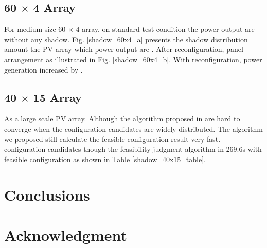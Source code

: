 \documentclass[conference]{IEEEtran}
\begin{document}
\subsection{60 $\times$ 4 Array}
For medium size 60 $\times$ 4 array, on standard test condition the power output are {\color{red}{how many KW}} without any shadow. Fig. \ref{shadow_60x4_a} presents the shadow distribution amount the PV array which power output are {\color{red}{how may KW}}. After reconfiguration, panel arrangement as illustrated in Fig. \ref{shadow_60x4_b}. With reconfiguration, power generation increased by {\color{red}{how many \%}}.
\subsection{40 $\times$ 15 Array}
As a large scale PV array. Although the algorithm proposed in \cite{orozco2016optimized} are hard to converge when the configuration candidates are widely distributed. The algorithm we proposed still calculate the feasible configuration result very fast. {\color{red}{60}} configuration candidates though the feasibility judgment algorithm in 269.6s with {\color{red}{20}} feasible configuration as shown in Table \ref{shadow_40x15_table}.
\section{Conclusions}\label{Sec7}

\section*{Acknowledgment}



\renewcommand\refname{Reference}


\end{document}
